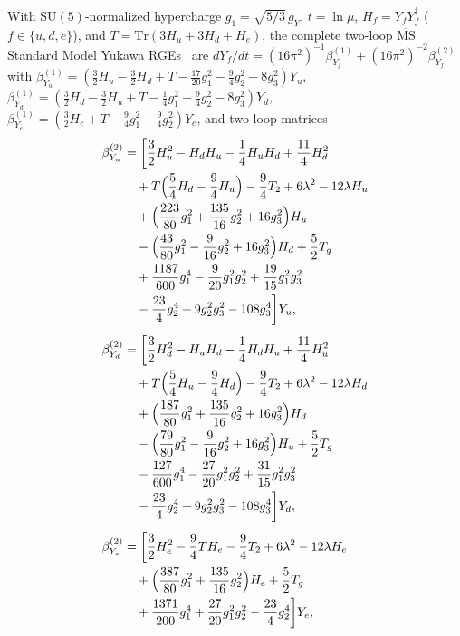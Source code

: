 \documentclass[aps,prd,twocolumn,nofootinbib,floatfix]{revtex4-2}
\begin{document}
With $\mathrm{SU}(5)$-normalized hypercharge $g_1 = \sqrt{5/3}\,g_Y$, $t = \ln\mu$, $H_f = Y_f Y_f^\dagger$ ($f \in \{u, d, e\}$), and $T = \mathrm{Tr}(3H_u + 3H_d + H_e)$, the complete two-loop $\overline{\mathrm{MS}}$ Standard Model Yukawa RGEs~\cite{MachacekVaughn1984,LuoXiao2003,Buttazzo2013} are $dY_f/dt = (16\pi^2)^{-1}\beta_{Y_f}^{(1)} + (16\pi^2)^{-2}\beta_{Y_f}^{(2)}$ with $\beta_{Y_u}^{(1)} = (\frac{3}{2}H_u - \frac{3}{2}H_d + T - \frac{17}{20}g_1^2 - \frac{9}{4}g_2^2 - 8g_3^2)Y_u$, $\beta_{Y_d}^{(1)} = (\frac{3}{2}H_d - \frac{3}{2}H_u + T - \frac{1}{4}g_1^2 - \frac{9}{4}g_2^2 - 8g_3^2)Y_d$, $\beta_{Y_e}^{(1)} = (\frac{3}{2}H_e + T - \frac{9}{4}g_1^2 - \frac{9}{4}g_2^2)Y_e$, and two-loop matrices
\begin{align}
\label{eq:beta_y_2loop}
\beta_{Y_u}^{(2)} &= \biggl[\frac{3}{2}H_u^2 - H_d H_u - \frac{1}{4}H_u H_d + \frac{11}{4}H_d^2 \nonumber\\
&\quad + T\Bigl(\frac{5}{4}H_d - \frac{9}{4}H_u\Bigr) - \frac{9}{4}T_2 + 6\lambda^2 - 12\lambda H_u \nonumber\\
&\quad + \Bigl(\frac{223}{80}g_1^2 + \frac{135}{16}g_2^2 + 16g_3^2\Bigr)H_u \nonumber\\
&\quad - \Bigl(\frac{43}{80}g_1^2 - \frac{9}{16}g_2^2 + 16g_3^2\Bigr)H_d + \frac{5}{2}T_g \nonumber\\
&\quad + \frac{1187}{600}g_1^4 - \frac{9}{20}g_1^2 g_2^2 + \frac{19}{15}g_1^2 g_3^2 \nonumber\\
&\quad - \frac{23}{4}g_2^4 + 9g_2^2 g_3^2 - 108g_3^4\biggr]Y_u, \nonumber\\[4pt]
\beta_{Y_d}^{(2)} &= \biggl[\frac{3}{2}H_d^2 - H_u H_d - \frac{1}{4}H_d H_u + \frac{11}{4}H_u^2 \nonumber\\
&\quad + T\Bigl(\frac{5}{4}H_u - \frac{9}{4}H_d\Bigr) - \frac{9}{4}T_2 + 6\lambda^2 - 12\lambda H_d \nonumber\\
&\quad + \Bigl(\frac{187}{80}g_1^2 + \frac{135}{16}g_2^2 + 16g_3^2\Bigr)H_d \nonumber\\
&\quad - \Bigl(\frac{79}{80}g_1^2 - \frac{9}{16}g_2^2 + 16g_3^2\Bigr)H_u + \frac{5}{2}T_g \nonumber\\
&\quad - \frac{127}{600}g_1^4 - \frac{27}{20}g_1^2 g_2^2 + \frac{31}{15}g_1^2 g_3^2 \nonumber\\
&\quad - \frac{23}{4}g_2^4 + 9g_2^2 g_3^2 - 108g_3^4\biggr]Y_d, \nonumber\\[4pt]
\beta_{Y_e}^{(2)} &= \biggl[\frac{3}{2}H_e^2 - \frac{9}{4}T H_e - \frac{9}{4}T_2 + 6\lambda^2 - 12\lambda H_e \nonumber\\
&\quad + \Bigl(\frac{387}{80}g_1^2 + \frac{135}{16}g_2^2\Bigr)H_e + \frac{5}{2}T_g \nonumber\\
&\quad + \frac{1371}{200}g_1^4 + \frac{27}{20}g_1^2 g_2^2 - \frac{23}{4}g_2^4\biggr]Y_e,
\end{align}
\end{document}
